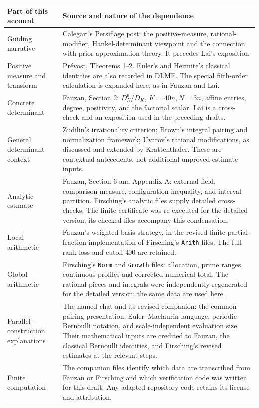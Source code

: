 \begin{longtable}{>{\raggedright\arraybackslash}p{}>{\raggedright\arraybackslash}p{}}
\toprule
Part of this account & Source and nature of the dependence\\
\midrule
\endhead
Guiding narrative &
Calegari's Persiflage post: the positive-measure, rational-modifier,
Hankel-determinant viewpoint and the connection with prior approximation
theory. It precedes Lai's exposition.\\[3pt]
Positive measure and transform &
Pr\'evost, Theorems 1--2. Euler's and Hermite's classical identities
are also recorded in DLMF. The special fifth-order calculation is
expanded here, as in Fauzan and Lai.\\[3pt]
Concrete determinant &
Fauzan, Section 2: \(D_N^6/D_K\), \(K=40n,N=3n\), affine entries,
degree, positivity, and the factorial scalar. Lai is a cross-check
and an exposition used in the preceding drafts.\\[3pt]
General determinant context &
Zudilin's irrationality criterion; Brown's integral pairing and
normalization framework; Uvarov's rational modifications, as discussed
and extended by Krattenthaler. These are contextual antecedents,
not additional unproved estimate inputs.\\[3pt]
Analytic estimate &
Fauzan, Section 6 and Appendix A: external field, comparison measure,
configuration inequality, and interval partition. Firsching's analytic
files supply detailed cross-checks. The finite certificate was re-executed
for the detailed version; its checked files accompany this condensation.\\[3pt]
Local arithmetic &
Fauzan's weighted-basis strategy, in the revised finite
partial-fraction implementation of Firsching's \texttt{Arith} files.
The full rank loss and cutoff 400 are retained.\\[3pt]
Global arithmetic &
Firsching's \texttt{Norm} and \texttt{Growth} files: allocation,
prime ranges, continuous profiles and corrected numerical total.
The rational pieces and integrals were independently regenerated
for the detailed version; the same data are used here.\\[3pt]
Parallel-construction explanations &
The named chat and its revised companion: the common-pairing
presentation, Euler--Maclaurin language, periodic Bernoulli notation,
and scale-independent evaluation size. Their mathematical inputs
are credited to Fauzan, the classical Bernoulli identities, and
Firsching's revised estimates at the relevant steps.\\[3pt]
Finite computation &
The companion files identify which data are transcribed from Fauzan
or Firsching and which verification code was written for this draft.
Any adapted repository code retains its license and attribution.\\
\bottomrule
\end{longtable}

